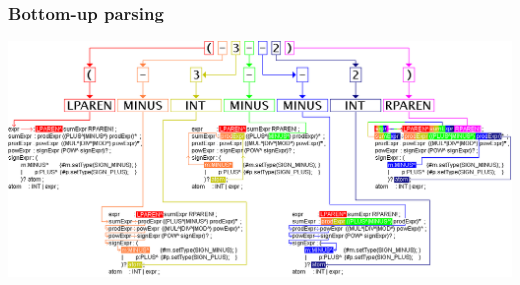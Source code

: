\documentclass{beamer}
\begin{document}
\begin{frame}
  \frametitle{Bottom-up parsing}
  \begin{center}
    \includegraphics[scale=0.3]{sillyastthing}
  \end{center}
\end{frame}
\end{document}
